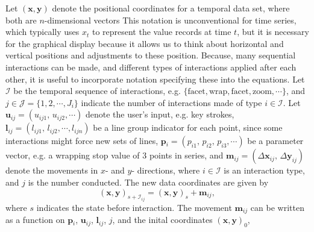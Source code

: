\documentclass[12pt]{article}
\begin{document}



Let $(\mathbf{x},\mathbf{y})$ denote the positional coordinates
for a temporal data set, where both are $n$-dimensional vectors
This notation is unconventional for time series, which typically
uses $x_t$ to represent the value records at time $t$, but it is
necessary for the graphical display because it allows us to think
about horizontal and vertical positions and adjustments to these
position. Because, many sequential interactions can be made, and
different types of interactions applied after each other, it is
useful to incorporate notation specifying these into the equations.
Let $\mathcal{I}$ be the temporal sequence of interactions,
e.g. $\{\textrm{facet},\textrm{wrap},\textrm{facet},
\textrm{zoom},\cdots\}$, and $j\in\mathcal{J}=\{1,2,\cdots,
J_{i}\}$ indicate the number of interactions made of type $i\in
\mathcal{I}$. Let $\mathbf{u}{}_{ij}=(u_{ij1},\, u_{ij2},\cdots)$
denote the user's input, e.g. key strokes,
$\mathbf{l}{}_{ij}=(l_{ij1},\, l_{ij2},\cdots, l_{ijn})$
be a line group indicator for each point, since some interactions might force new sets of lines,
$\mathbf{p}{}_{i}=(p_{i1},\, p_{i2},\, p_{i3},\cdots)$
be a parameter vector, e.g. a wrapping stop value of 3 points in series, and
$\mathbf{m}{}_{ij}=(\Delta\mathbf{x}{}_{ij},\,\Delta\mathbf{y}_{ij})$
denote the movements in $x$- and $y$- directions, where $i\in\mathcal{I}$
is an interaction type, and $j$ is the number conducted.
The new data coordinates are given by
\[
(\mathbf{x},\mathbf{y})_{s+\mathcal{I}_{ij}}=(\mathbf{x},\mathbf{y})_{s}+\mathbf{m}{}_{ij},
\]
where $s$ indicates the state before interaction.
The movement $\mathbf{m}{}_{ij}$ can be written as a function on $\mathbf{p}{}_{i}$,
$\mathbf{u}{}_{ij}$, $\mathbf{l}_{ij}$, $j$, and the inital
coordinates $(\mathbf{x},\mathbf{y})_0$,
\end{document}
